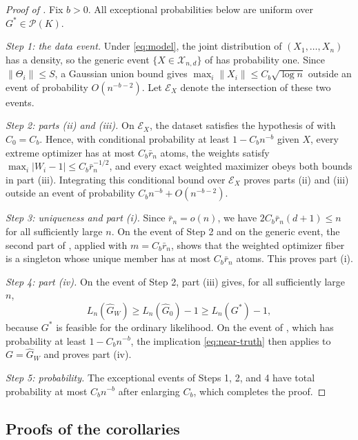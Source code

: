 \documentclass[11pt]{article}
\theoremstyle{definition}
\theoremstyle{remark}
\newcommand{\Pcal}{\mathcal P}
\newcommand{\norm}[1]{\lVert #1\rVert}
\newcommand{\abs}[1]{\lvert #1\rvert}
\newcommand{\Ghat}{\widehat G}
\begin{document}
\begin{proof}[Proof of ]
Fix $b>0$.  All exceptional probabilities below are uniform over
$G^*\in\Pcal(K)$.

\emph{Step 1: the data event.}  Under \eqref{eq:model}, the joint
distribution of $(X_1,\ldots,X_n)$ has a density, so the generic event
$\{X\in\mathcal X_{n,d}\}$ of  has probability one.
Since $\norm{\Theta_i}\le S$, a Gaussian union bound gives
$\max_i\norm{X_i}\le C_b\sqrt{\log n}$ outside an event of probability
$O(n^{-b-2})$.  Let $\mathcal E_X$ denote the intersection of these two
events.

\emph{Step 2: parts \textup{(ii)} and \textup{(iii)}.}  On $\mathcal E_X$,
the dataset satisfies the hypothesis of  with
$C_0=C_b$.  Hence, with conditional probability at least $1-C_bn^{-b}$ given
$X$, every extreme optimizer has at most $C_b\bar r_n$ atoms, the weights
satisfy $\max_i\abs{W_i-1}\le C_b\bar r_n^{-1/2}$, and every exact weighted
maximizer obeys both bounds in part (iii).  Integrating this conditional
bound over $\mathcal E_X$ proves parts (ii) and (iii) outside an event of
probability $C_bn^{-b}+O(n^{-b-2})$.

\emph{Step 3: uniqueness and part \textup{(i)}.}  Since $\bar r_n=o(n)$,
we have $2C_b\bar r_n(d+1)\le n$ for all sufficiently large $n$.  On the
event of Step 2 and on the generic event, the second part of
, applied with $m=C_b\bar r_n$, shows that the weighted
optimizer fiber is a singleton whose unique member has at most $C_b\bar r_n$
atoms.  This proves part (i).

\emph{Step 4: part \textup{(iv)}.}  On the event of Step 2, part (iii) gives,
for all sufficiently large $n$,
\[
 L_n(\Ghat_W)\ge L_n(\Ghat_0)-1\ge L_n(G^*)-1,
\]
because $G^*$ is feasible for the ordinary likelihood.  On the event of
, which has probability at least $1-C_bn^{-b}$, the
implication \eqref{eq:near-truth} then applies to $G=\Ghat_W$ and proves
part (iv).

\emph{Step 5: probability.}  The exceptional events of Steps 1, 2, and 4
have total probability at most $C_bn^{-b}$ after enlarging $C_b$, which
completes the proof.
\end{proof}

\subsection{Proofs of the corollaries}\label{app:proof-corollaries}
\end{document}
